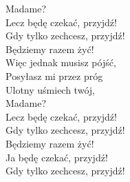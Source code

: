 \begin{flushleft}
\hspace{0.9cm}Madame? \\
\hspace{0.9cm}Lecz będę czekać, przyjdź! \\
\hspace{0.9cm}Gdy tylko zechcesz, przyjdź! \\
\hspace{0.9cm}Będziemy razem żyć! \\
\vskip 3mm
\hspace{0.9cm}Więc jednak musisz pójść, \\
\hspace{0.9cm}Posyłasz mi przez próg \\
\hspace{0.9cm}Ulotny uśmiech twój, \\
\hspace{0.9cm}Madame? \\
\hspace{0.9cm}Lecz będę czekać, przyjdź! \\
\hspace{0.9cm}Gdy tylko zechcesz, przyjdź! \\
\hspace{0.9cm}Będziemy razem żyć! \\
\vskip 3mm
\hspace{0.9cm}Ja będę czekać, przyjdź! \\
\hspace{0.9cm}Gdy tylko zechcesz, przyjdź! \\
\end{flushleft}
\clearpage
